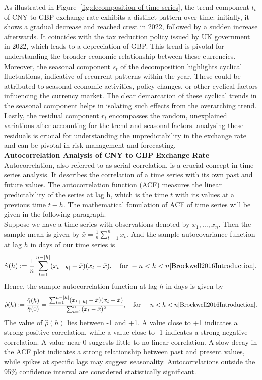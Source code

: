 \documentclass{article}\usepackage[]{graphicx}\usepackage[]{xcolor}
\begin{document}
\noindent
As illustrated in Figure~\ref{fig:decomposition of time series}, the trend component $t_t$ of CNY to GBP exchange rate exhibits a distinct pattern over time: initially, it shows a gradual decrease and reached crest in 2022, followed by a sudden increase afterwards. It coincides with the tax reduction policy issued by UK government in 2022, which leads to a depreciation of GBP. This trend is pivotal for understanding the broader economic relationship between these currencies. \\

\noindent
Moreover, the seasonal component $s_t$ of the decomposition highlights cyclical fluctuations, indicative of recurrent patterns within the year. These could be attributed to seasonal economic activities, policy changes, or other cyclical factors influencing the currency market. The clear demarcation of these cyclical trends in the seasonal component helps in isolating such effects from the overarching trend.\\

\noindent
Lastly, the residual component $r_t$ encompasses the random, unexplained variations after accounting for the trend and seasonal factors. analysing these residuals is crucial for understanding the unpredictability in the exchange rate and can be pivotal in risk management and forecasting.\\

\noindent
\textbf{Autocorrelation Analysis of CNY to GBP Exchange Rate}\\
\noindent
Autocorrelation, also referred to as serial correlation, is a crucial concept in time series analysis. It describes the correlation of a time series with its own past and future values. The autocorrelation function (ACF) measures the linear predictability of the series at lag h, which is the time $t$ with its values at a previous time $t-h$. The mathematical fomulation of ACF of time series will be given in the following paragraph.\\

\noindent
Suppose we have a time series with observations denoted by \( x_1, \ldots, x_n \). Then the sample mean is given by $\bar{x} = \frac{1}{n} \sum_{t=1}^{n} x_t.$
And the sample autocovariance function at lag $h$ in days of our time series is
\[\hat{\gamma}(h) := \frac{1}{n} \sum_{t=1}^{n-|h|} (x_{t+|h|} - \bar{x})(x_t - \bar{x}), \quad \text{for} \; -n < h < n \cite{Brockwell2016Introduction}.\]
Hence, the sample autocorrelation function at lag $h$ in days is given by
\[\hat{\rho}(h) := \frac{\hat{\gamma}(h)}{\hat{\gamma}(0)} = \frac{\sum_{t=1}^{n-|h|} (x_{t+|h|} - \bar{x})(x_t - \bar{x})}{\sum_{t=1}^{n} (x_t - \bar{x})^{2}}, \quad \text{for} \; -n < h < n \cite{Brockwell2016Introduction}.\]
\noindent
The value of $\hat{\rho}(h)$ lies between -1 and +1. A value close to +1 indicates a strong positive correlation, while a value close to -1 indicates a strong negative correlation. A value near 0 suggests little to no linear correlation. A slow decay in the ACF plot indicates a strong relationship between past and present values, while spikes at specific lags may suggest seasonality. Autocorrelations outside the 95\% confidence interval are considered statistically significant.\\
\end{document}
